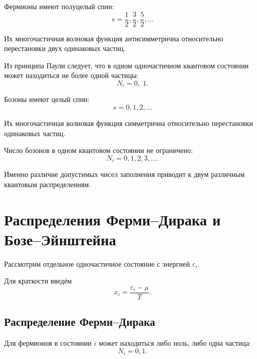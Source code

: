 \documentclass[../final.tex]{subfiles}
\begin{document}
Фермионы имеют полуцелый спин:
%
\begin{equation*}
    s
    =
    \frac{1}{2},
    \frac{3}{2},
    \frac{5}{2},
    \ldots
\end{equation*}

Их многочастичная волновая функция антисимметрична относительно
перестановки двух одинаковых частиц.

Из принципа Паули следует, что в одном одночастичном квантовом
состоянии может находиться не более одной частицы:
%
\[
    \boxed{
        N_i
        =
        0,\;1
    }.
\]

Бозоны имеют целый спин:
%
\begin{equation*}
    s
    =
    0,1,2,\ldots
\end{equation*}

Их многочастичная волновая функция симметрична относительно
перестановки одинаковых частиц.

Число бозонов в одном квантовом состоянии не ограничено:
%
\[
    \boxed{
        N_i
        =
        0,1,2,3,\ldots
    }.
\]

Именно различие допустимых чисел заполнения приводит к двум
различным квантовым распределениям.


\section{Распределения Ферми--Дирака и Бозе--Эйнштейна}

Рассмотрим отдельное одночастичное состояние с энергией
$\varepsilon_i$.

Для краткости введём
%
\begin{equation*}
    x_i
    =
    \frac{\varepsilon_i-\mu}{T}.
\end{equation*}


\subsection{Распределение Ферми--Дирака}

Для фермионов в состоянии $i$ может находиться либо ноль,
либо одна частица:
%
\begin{equation*}
    N_i
    =
    0,1.
\end{equation*}
\end{document}
